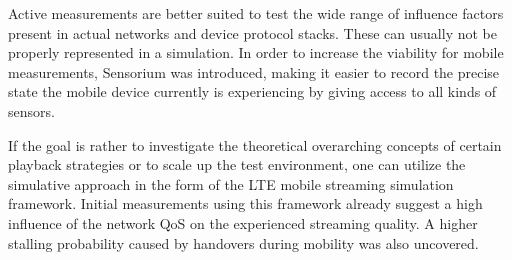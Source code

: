 Active measurements are better suited to test the wide range of influence factors present in actual networks and device protocol stacks. These can usually not be properly represented in a simulation. In order to increase the viability for mobile measurements, Sensorium was introduced, making it easier to record the precise state the mobile device currently is experiencing by giving access to all kinds of sensors.

If the goal is rather to investigate the theoretical overarching concepts of certain playback strategies or to scale up the test environment, one can utilize the simulative approach in the form of the \gls{LTE} mobile streaming simulation framework. Initial measurements using this framework already suggest a high influence of the network \gls{QoS} on the experienced streaming quality. A higher stalling probability caused by handovers during mobility was also uncovered.









